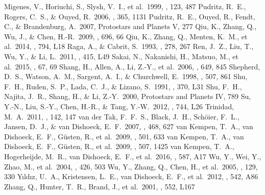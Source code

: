 \documentclass[twocolumn]{aastex62}
\begin{document}
\begin{thebibliography}{}
 Migenes, V., Horiuchi, S., Slysh, V.~I., et al.\ 1999, \apjs, 123, 487
 Pudritz, R.~E., Rogers, C.~S., \& Ouyed, R.\ 2006, \mnras, 365, 1131 
 Pudritz, R.~E., Ouyed, R., Fendt, C., \& Brandenburg, A.\ 2007, Protostars and Planets V, 277
 Qiu, K., Zhang, Q., Wu, J., \& Chen, H.-R.\ 2009, \apj, 696, 66
 Qiu, K., Zhang, Q., Menten, K.~M., et al.\ 2014, \apjl, 794, L18 
 Raga, A., \& Cabrit, S.\ 1993, \aap, 278, 267 
 Ren, J.~Z., Liu, T., Wu, Y., \& Li, L.\ 2011, \mnras, 415, L49 
 Sakai, N., Nakanishi, H., Matsuo, M., et al.\ 2015, \pasj, 67, 69
 Shang, H., Allen, A., Li, Z.-Y., et al.\ 2006, \apj, 649, 845 
 Shepherd, D.~S., Watson, A.~M., Sargent, A.~I., \& Churchwell, E.\ 1998, \apj, 507, 861 
 Shu, F.~H., Ruden, S.~P., Lada, C.~J., \& Lizano, S.\ 1991, \apjl, 370, L31
 Shu, F.~H., Najita, J.~R., Shang, H., \& Li, Z.-Y.\ 2000, Protostars and Planets IV, 789
 Su, Y.-N., Liu, S.-Y., Chen, H.-R., \& Tang, Y.-W.\ 2012, \apjl, 744, L26 
 Trinidad, M.~A.\ 2011, \aj, 142, 147 
 van der Tak, F.~F.~S., Black, J.~H., Sch{\"o}ier, F.~L., Jansen, D.~J., \& van Dishoeck, E.~F.\ 2007, \aap, 468, 627
 van Kempen, T.~A., van Dishoeck, E.~F., G{\"u}sten, R., et al.\ 2009, \aap, 501, 633 
 van Kempen, T.~A., van Dishoeck, E.~F., G{\"u}sten, R., et al.\ 2009, \aap, 507, 1425 
 van Kempen, T.~A., Hogerheijde, M.~R., van Dishoeck, E.~F., et al.\ 2016, \aap, 587, A17
 Wu, Y., Wei, Y., Zhao, M., et al.\ 2004, \aap, 426, 503
 Wu, Y., Zhang, Q., Chen, H., et al.\ 2005, \aj, 129, 330 
 Y{\i}ld{\i}z, U.~A., Kristensen, L.~E., van Dishoeck, E.~F., et al.\ 2012, \aap, 542, A86
 Zhang, Q., Hunter, T.~R., Brand, J., et al.\ 2001, \apjl, 552, L167 
\end{thebibliography}
\end{document}
